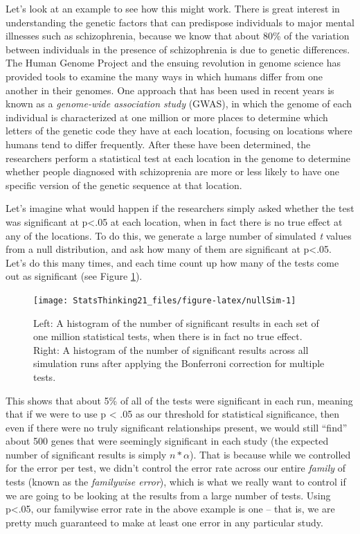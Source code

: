 \documentclass[12pt,]{book}
\theoremstyle{definition}
\theoremstyle{definition}
\theoremstyle{definition}
\theoremstyle{remark}
\begin{document}
Let's look at an example to see how this might work. There is great interest in understanding the genetic factors that can predispose individuals to major mental illnesses such as schizophrenia, because we know that about 80\% of the variation between individuals in the presence of schizophrenia is due to genetic differences. The Human Genome Project and the ensuing revolution in genome science has provided tools to examine the many ways in which humans differ from one another in their genomes. One approach that has been used in recent years is known as a \emph{genome-wide association study} (GWAS), in which the genome of each individual is characterized at one million or more places to determine which letters of the genetic code they have at each location, focusing on locations where humans tend to differ frequently. After these have been determined, the researchers perform a statistical test at each location in the genome to determine whether people diagnosed with schizoprenia are more or less likely to have one specific version of the genetic sequence at that location.

Let's imagine what would happen if the researchers simply asked whether the test was significant at p\textless{}.05 at each location, when in fact there is no true effect at any of the locations. To do this, we generate a large number of simulated \emph{t} values from a null distribution, and ask how many of them are significant at p\textless{}.05. Let's do this many times, and each time count up how many of the tests come out as significant (see Figure \ref{fig:nullSim}).

\begin{figure}
\texttt{[image: StatsThinking21\_files/figure-latex/nullSim-1]} \caption{Left: A histogram of the number of significant results in each set of one million statistical tests, when there is in fact no true effect. Right: A histogram of the number of significant results across all simulation runs after applying the Bonferroni correction for multiple tests.}\label{fig:nullSim}
\end{figure}

This shows that about 5\% of all of the tests were significant in each run, meaning that if we were to use p \textless{} .05 as our threshold for statistical significance, then even if there were no truly significant relationships present, we would still ``find'' about 500 genes that were seemingly significant in each study (the expected number of significant results is simply \(n * \alpha\)). That is because while we controlled for the error per test, we didn't control the error rate across our entire \emph{family} of tests (known as the \emph{familywise error}), which is what we really want to control if we are going to be looking at the results from a large number of tests. Using p\textless{}.05, our familywise error rate in the above example is one -- that is, we are pretty much guaranteed to make at least one error in any particular study.
\end{document}

